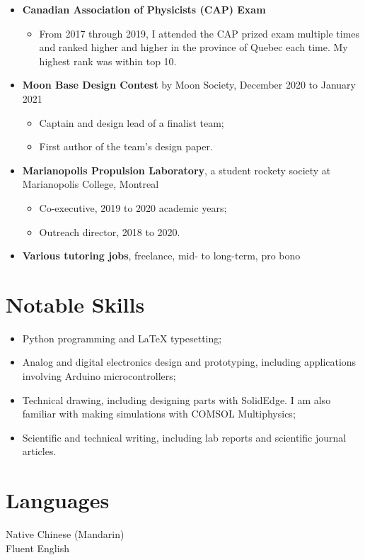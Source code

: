 \documentclass{article}
\newcommand{\cvsection}[1]{\section*{\rmfamily#1}}
\begin{document}
\begin{itemize}
    \item \textbf{Canadian Association of Physicists (CAP) Exam}
    \begin{itemize}
        \item From 2017 through 2019, I attended the CAP prized exam multiple times and ranked higher and higher in the province of Quebec each time. My highest rank was within top 10. 
    \end{itemize}

    \item \textbf{Moon Base Design Contest} by Moon Society, December 2020 to January 2021
    \begin{itemize}
        \item Captain and design lead of a finalist team;
        \item First author of the team's design paper.
    \end{itemize}

    \item \textbf{Marianopolis Propulsion Laboratory}, a student rockety society at Marianopolis College, Montreal
    \begin{itemize}
        \item Co-executive, 2019 to 2020 academic years;
        \item Outreach director, 2018 to 2020.
    \end{itemize}

    \item \textbf{Various tutoring jobs}, freelance, mid- to long-term, pro bono

\end{itemize}

\cvsection{Notable Skills}

\begin{itemize}
    \item Python programming and LaTeX typesetting;
    
    \item Analog and digital electronics design and prototyping, including applications involving Arduino microcontrollers;
    
    \item Technical drawing, including designing parts with SolidEdge. I am also familiar with making simulations with COMSOL Multiphysics;
    
    \item Scientific and technical writing, including lab reports and scientific journal articles.
    
    
\end{itemize}

\cvsection{Languages}
\hspace*{2em} Native Chinese (Mandarin) \\
\hspace*{2em} Fluent English
\end{document}
